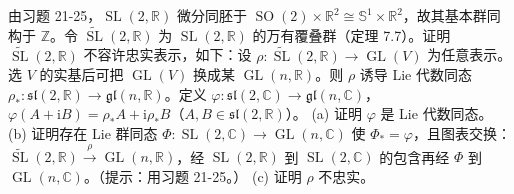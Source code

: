 \documentclass[../../main.tex]{subfiles}
\begin{document}
\begin{exercise}\label{exercise:ch21-26}
由习题 21-25，$\operatorname{SL}(2,\mathbb{R})$ 微分同胚于 $\operatorname{SO}(2)\times\mathbb{R}^2\cong\mathbb{S}^1\times\mathbb{R}^2$，故其基本群同构于 $\mathbb{Z}$。令 $\widetilde{\operatorname{SL}}(2,\mathbb{R})$ 为 $\operatorname{SL}(2,\mathbb{R})$ 的万有覆叠群（定理 7.7）。证明 $\widetilde{\operatorname{SL}}(2,\mathbb{R})$ 不容许忠实表示，如下：设 $\rho\colon\widetilde{\operatorname{SL}}(2,\mathbb{R})\to\operatorname{GL}(V)$ 为任意表示。选 $V$ 的实基后可把 $\operatorname{GL}(V)$ 换成某 $\operatorname{GL}(n,\mathbb{R})$。则 $\rho$ 诱导 Lie 代数同态 $\rho_\ast\colon\mathfrak{sl}(2,\mathbb{R})\to\mathfrak{gl}(n,\mathbb{R})$。定义 $\varphi\colon\mathfrak{sl}(2,\mathbb{C})\to\mathfrak{gl}(n,\mathbb{C})$，$\varphi(A+\mathrm{i}B)=\rho_\ast A+\mathrm{i}\rho_\ast B$（$A,B\in\mathfrak{sl}(2,\mathbb{R})$）。
(a) 证明 $\varphi$ 是 Lie 代数同态。
(b) 证明存在 Lie 群同态 $\Phi\colon\operatorname{SL}(2,\mathbb{C})\to\operatorname{GL}(n,\mathbb{C})$ 使 $\Phi_\ast=\varphi$，且图表交换：$\widetilde{\operatorname{SL}}(2,\mathbb{R})\xrightarrow{\rho}\operatorname{GL}(n,\mathbb{R})$，经 $\operatorname{SL}(2,\mathbb{R})$ 到 $\operatorname{SL}(2,\mathbb{C})$ 的包含再经 $\Phi$ 到 $\operatorname{GL}(n,\mathbb{C})$。（提示：用习题 21-25。）
(c) 证明 $\rho$ 不忠实。
\end{exercise}
\end{document}
